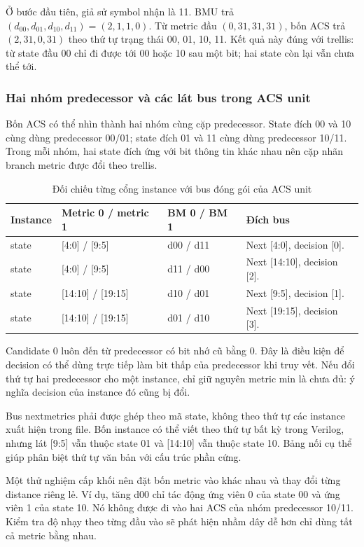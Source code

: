 \documentclass[12pt,a4paper]{article}
\renewcommand{\_}{\originalunderscore\allowbreak}
\begin{document}
Ở bước đầu tiên, giả sử symbol nhận là 11. BMU trả $(d_{00},d_{01},d_{10},d_{11})=(2,1,1,0)$. Từ metric đầu $(0,31,31,31)$, bốn ACS trả $(2,31,0,31)$ theo thứ tự trạng thái 00, 01, 10, 11. Kết quả này đúng với trellis: từ state đầu 00 chỉ đi được tới 00 hoặc 10 sau một bit; hai state còn lại vẫn chưa thể tới.


\subsubsection{Hai nhóm predecessor và các lát bus trong ACS unit}
Bốn ACS có thể nhìn thành hai nhóm cùng cặp predecessor. State đích 00 và 10 cùng dùng predecessor 00/01; state đích 01 và 11 cùng dùng predecessor 10/11. Trong mỗi nhóm, hai state đích ứng với bit thông tin khác nhau nên cặp nhãn branch metric được đổi theo trellis.
\begin{table}[H]\centering\small
\begin{tabularx}{\textwidth}{@{}P{2.4cm}P{3cm}P{3cm}Y@{}}\toprule
\textbf{Instance}&\textbf{Metric 0 / metric 1}&\textbf{BM 0 / BM 1}&\textbf{Đích bus}\\\midrule
state\_00&[4:0] / [9:5]&d00 / d11&Next [4:0], decision [0].\\
state\_10&[4:0] / [9:5]&d11 / d00&Next [14:10], decision [2].\\
state\_01&[14:10] / [19:15]&d10 / d01&Next [9:5], decision [1].\\
state\_11&[14:10] / [19:15]&d01 / d10&Next [19:15], decision [3].\\\bottomrule
\end{tabularx}
\caption{Đối chiếu từng cổng instance với bus đóng gói của ACS unit}
\end{table}
Candidate 0 luôn đến từ predecessor có bit nhớ cũ bằng 0. Đây là điều kiện để decision có thể dùng trực tiếp làm bit thấp của predecessor khi truy vết. Nếu đổi thứ tự hai predecessor cho một instance, chỉ giữ nguyên metric min là chưa đủ: ý nghĩa decision của instance đó cũng bị đổi.

Bus next\_metrics phải được ghép theo mã state, không theo thứ tự các instance xuất hiện trong file. Bốn instance có thể viết theo thứ tự bất kỳ trong Verilog, nhưng lát [9:5] vẫn thuộc state 01 và [14:10] vẫn thuộc state 10. Bảng nối cụ thể giúp phân biệt thứ tự văn bản với cấu trúc phần cứng.

Một thử nghiệm cấp khối nên đặt bốn metric vào khác nhau và thay đổi từng distance riêng lẻ. Ví dụ, tăng d00 chỉ tác động ứng viên 0 của state 00 và ứng viên 1 của state 10. Nó không được đi vào hai ACS của nhóm predecessor 10/11. Kiểm tra độ nhạy theo từng đầu vào sẽ phát hiện nhầm dây dễ hơn chỉ dùng tất cả metric bằng nhau.
\end{document}
